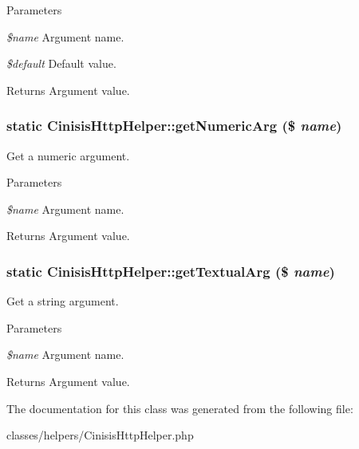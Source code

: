 \begin{DoxyParams}{Parameters}
\item[{\em \$name}]Argument name.\item[{\em \$default}]Default value.\end{DoxyParams}
\begin{DoxyReturn}{Returns}
Argument value. 
\end{DoxyReturn}
\hypertarget{classCinisisHttpHelper_a6490e2a456242fae618802f4dac2e553}{
\subsubsection[{getNumericArg}]{\setlength{\rightskip}{0pt plus 5cm}static CinisisHttpHelper::getNumericArg (\$ {\em name})}}
\label{classCinisisHttpHelper_a6490e2a456242fae618802f4dac2e553}
Get a numeric argument.


\begin{DoxyParams}{Parameters}
\item[{\em \$name}]Argument name.\end{DoxyParams}
\begin{DoxyReturn}{Returns}
Argument value. 
\end{DoxyReturn}
\hypertarget{classCinisisHttpHelper_a6bf24e1b8e1d90e59b52813bb2a65378}{
\subsubsection[{getTextualArg}]{\setlength{\rightskip}{0pt plus 5cm}static CinisisHttpHelper::getTextualArg (\$ {\em name})}}
\label{classCinisisHttpHelper_a6bf24e1b8e1d90e59b52813bb2a65378}
Get a string argument.


\begin{DoxyParams}{Parameters}
\item[{\em \$name}]Argument name.\end{DoxyParams}
\begin{DoxyReturn}{Returns}
Argument value. 
\end{DoxyReturn}


The documentation for this class was generated from the following file:\begin{DoxyCompactItemize}
\item 
classes/helpers/CinisisHttpHelper.php\end{DoxyCompactItemize}
